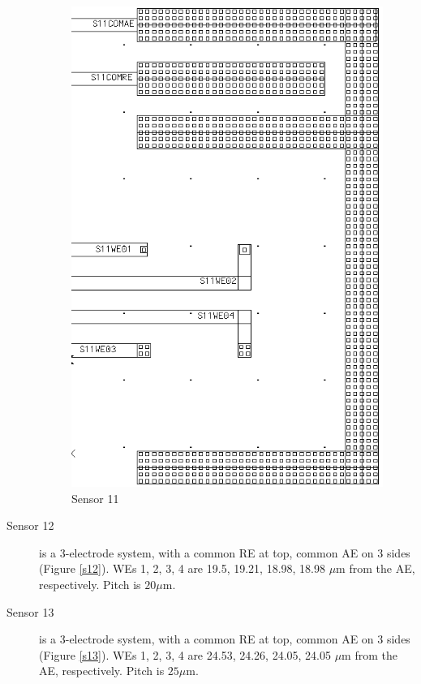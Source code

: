 \begin{description}
\begin{figure}
\begin{minipage}{0.5\linewidth}
		\includegraphics[width=0.6\linewidth]{figures/s11.png}
		\caption{Sensor 11}
		\label{s11}
	\end{minipage}
\end{figure}

\item[Sensor 12] is a 3-electrode system, with a common RE at top, common AE on 3 sides (Figure \ref{s12}). WEs 1, 2, 3, 4 are 19.5, 19.21, 18.98, 18.98 $\mu \mathrm{m}$ from the AE, respectively. Pitch is $20 \mu \mathrm{m}$.
\item[Sensor 13] is a 3-electrode system, with a common RE at top, common AE on 3 sides (Figure \ref{s13}). WEs 1, 2, 3, 4 are 24.53, 24.26, 24.05, 24.05 $\mu \mathrm{m}$ from the AE, respectively. Pitch is $25 \mu \mathrm{m}$.


\end{description}
